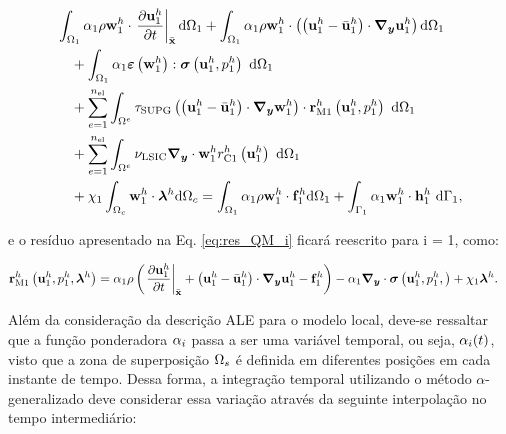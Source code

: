 \documentclass[tese_patricia]{subfiles}
\begin{document}
\begin{align}
	\begin{split}
		&\int_{\localModel} \arlequinWFLocal \density \wlocalh \cdot \left. \frac{\partial\ulocalh}{\partial t} \right|_{\posALE} \deriv \localModel +
		\int_{\localModel} \arlequinWFLocal \density \wlocalh \cdot  \left(\left(\ulocalh - \velocityALEh_{1}\right) \cdot \gradient \ulocalh\right) \deriv \localModel  \\ 
		&\quad+	
		\int_{\localModel} \arlequinWFLocal \straintensor \left(\wlocalh\right) : \stresstensor \left(\ulocalh,\plocalh\right)\ \deriv \localModel 
		\\ 
		&\quad+ \sum_{e=1}^{\nel} \int_{\domainE} \SUPG  \left( \left(\ulocalh - \velocityALEh_{1}\right) \cdot \gradient \wlocalh\right) \cdot \resMomLocal\left(\ulocalh,\plocalh \right)\  \deriv \localModel \\ 
		&\quad+\sum_{e=1}^{\nel} \int_{\domainE} \LSIC \divergence \cdot \wlocalh \resPreLocal
		\left(\ulocalh\right)\  \deriv \localModel \\
		&\quad+  \chi_{1} \int_{\gluingZone} \wlocalh \cdot \lagrangeMultiplierh \deriv \gluingZone  = \int_{\localModel} \arlequinWFLocal \density \wlocalh \cdot  \localsbodyforceh \deriv \localModel + \int_{\localBoundary} \arlequinWFLocal \wlocalh \cdot \localSurfaceLoadh\ \deriv \localBoundary,
		\label{eq:eq:QM_forma_fraca_1_ALE}
	\end{split}
\end{align}

\noindent e o resíduo apresentado na Eq. \ref{eq:res_QM_i} ficará reescrito para i = 1, como:


\begin{align}
	\mathbf{r}_{\mathrm{M1}}^{h} \left(\mathbf{u}_1^h,p_1^h,\boldsymbol{\lambda}^h \right)&=\alpha_1 \rho\left(\left. \frac{\partial\mathbf{u}_1^h}{\partial t} \right|_{\bar{\mathbf{x}}}+ \left(\mathbf{u}_1^h - \bar{\mathbf{u}}^h_{1}\right) \cdot \boldsymbol{\nabla_y} \mathbf{u}_1^h  - \mathbf{f}_1^h\right) - \alpha_1 \boldsymbol{\nabla_y} \cdot \boldsymbol{\sigma}\left(\mathbf{u}_1^h,p_1^h,\right)+ \chi_{1} \boldsymbol{\lambda}^h \label{eq:res_QM_ALE}.
\end{align}

Além da consideração da descrição ALE para o modelo local, deve-se ressaltar que a função ponderadora $\alpha_i$ passa a ser uma variável temporal, ou seja, $\alpha_i(t)$, visto que a zona de superposição $\Omega_s$ é definida em diferentes posições em cada instante de tempo. Dessa forma, a integração temporal utilizando o método $\alpha$-generalizado deve considerar essa variação através da seguinte interpolação no tempo intermediário:
\end{document}
